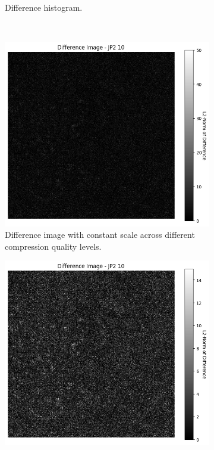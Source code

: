 \begin{figure}[htb]
\begin{subfigure}[b]{0.48\textwidth}
        \caption{Difference histogram.}
        \label{fig:img_quality_comp_jp2_10_center_histo}
    \end{subfigure}
    \\
    \begin{subfigure}[b]{0.48\textwidth}
        \centering
        \includegraphics[width=\textwidth]{doc/thesis/0_figures/compare_quality/set1/jp2_10_center_diff_heatmap.png}
        \caption{Difference image with constant scale across different compression quality levels.}
        \label{fig:img_quality_comp_jp2_10_center_diff}
    \end{subfigure}
    \begin{subfigure}[b]{0.48\textwidth}
        \centering
        \includegraphics[width=\textwidth]{doc/thesis/0_figures/compare_quality/set1/jp2_10_center_diff_heatmap_rel.png}

\end{subfigure}
\end{figure}
